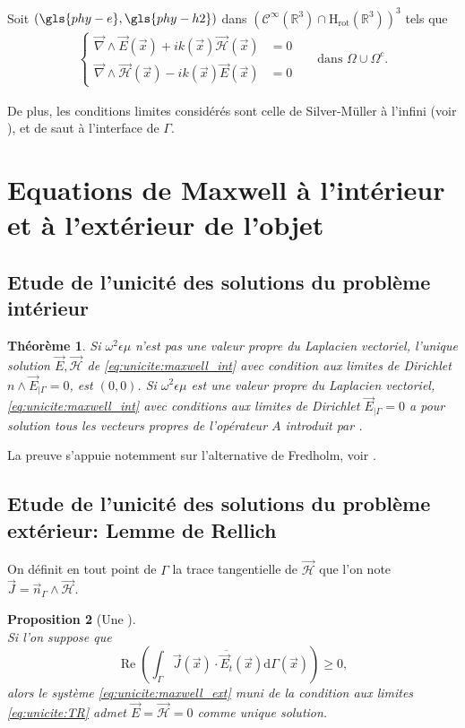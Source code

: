 \documentclass[12pt,%
    twoside,%
    a4paper,%
    openright, %
    ]{book}
\numberwithin{equation}{section} %
\newtheorem{thm}{Théorème}[chapter] %
\newtheorem{prop}[thm]{Proposition}
\newcommand{\pvect}{\wedge}
\newcommand{\vect}[1]{{\overset{\rightarrow}{#1}}}
\newcommand{\conj}[1]{{\overline{#1}}}
\newcommand{\w}{\omega}
\newcommand{\RR}{\mathbb R}
\newcommand{\eps}{\epsilon}
\newcommand{\dd}{\mathrm{d}}
\newcommand{\OO}{\Omega}
\newcommand{\Sobdw}[1][{}]{\mathrm{H}_\mathrm{#1}}
\newcommand{\Hrot}{\Sobdw[rot]}
\renewcommand{\Re}{\operatorname{Re}}
\newcommand{\vE}{\vect{E}}
\newcommand{\cH}{\mathcal{H}}
\newcommand{\vH}{\vect{\cH}}
\newcommand{\vn}{\vect{n}}
\newcommand{\vx}{\vect{x}}
\newcommand{\vJ}{\vect{J}}
\newcommand{\vrot}{\vect{\nabla}\pvect}
\begin{document}
Soit \((\gls{phy-e},\gls{phy-h2})\) dans \((\mathcal{C}^\infty(\RR^3)\cap\Hrot(\RR^3))^3\) tels que
\begin{align}
\left\lbrace
\begin{matrix}
    \vrot \vE(\vx) + i k(\vx) \vH(\vx) &= 0
    \\
    \vrot \vH(\vx) - i k(\vx) \vE(\vx) &= 0
\end{matrix}
\right. && \text{dans \(\OO\cup\OO^c\).}
\label{eq:unicite:maxwell_ext}
\end{align}

De plus, les conditions limites considérés sont celle de Silver-Müller à l'infini (voir \cite[eq (5.2.24), p.~183]{nedelec_acoustic_2001}), et de saut à l'interface de \(\Gamma\).

\section{Equations de Maxwell à l'intérieur et à l'extérieur de l'objet}

    \subsection{Etude de l'unicité des solutions du problème intérieur}

        \begin{thm}
            Si \(\w^2\eps\mu\) n'est pas une valeur propre du Laplacien vectoriel, l'unique solution \(\vE,\vH\) de \eqref{eq:unicite:maxwell_int} avec condition aux limites de Dirichlet \(n\wedge \vE_{|\Gamma} = 0\),  est \((0,0)\).
            Si \(\w^2\eps\mu\) est une valeur propre du Laplacien vectoriel, \eqref{eq:unicite:maxwell_int} avec conditions aux limites de Dirichlet \(\vE_{|\Gamma} = 0\) a pour solution tous les vecteurs propres de l'opérateur \(A\) introduit par \cite[eq.~(133), p.~58]{cessenat_mathematical_1996}.
        \end{thm}
        La preuve s'appuie notemment sur l'alternative de Fredholm, voir \cite[Théorème~8, p.~111]{cessenat_mathematical_1996}.

    \subsection{Etude de l'unicité des solutions du problème extérieur: Lemme de Rellich}

        On définit en tout point de \(\Gamma\) la trace tangentielle de \(\vH\) que l'on note \(\vJ = \vn_\Gamma \pvect \vH\).
        \begin{prop}[Une ]~\\
        Si l'on suppose que
        \begin{equation}
            \label{eq:unicite:form_var:cgu}
            \Re\left(\int_\Gamma \vJ(\vx) \cdot \conj{\vE_t}(\vx) \dd{\Gamma(\vx)}\right) \ge 0,
        \end{equation}
        alors le système \eqref{eq:unicite:maxwell_ext} muni de la condition aux limites \eqref{eq:unicite:TR} admet \(\vE=\vH=0\) comme unique solution.
        \end{prop}
    
\end{document}
